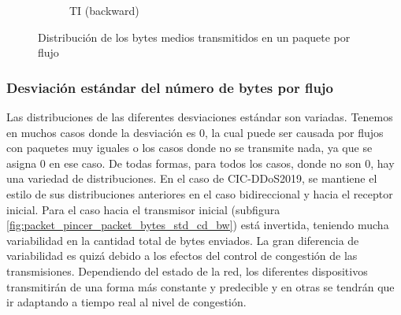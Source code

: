 \begin{figure}[H]
\begin{subfigure}[b]{0.26\textwidth}
        \caption{TI (backward)}
    \end{subfigure}
    \hfill
       \caption{Distribución de los bytes medios transmitidos en un paquete por flujo}
       \label{fig:packet_pincer_packet_bytes_mean}
\end{figure}

\subsubsection{Desviación estándar del número de bytes por flujo}

Las distribuciones de las diferentes desviaciones estándar son variadas. Tenemos en muchos casos donde la desviación es 0, la cual puede ser causada por flujos con paquetes muy iguales o los casos donde no se transmite nada, ya que se asigna 0 en ese caso. De todas formas, para todos los casos, donde no son 0, hay una variedad de distribuciones. En el caso de CIC-DDoS2019, se mantiene el estilo de sus distribuciones anteriores en el caso bidireccional y hacia el receptor inicial. Para el caso hacia el transmisor inicial (subfigura \ref{fig:packet_pincer_packet_bytes_std_cd_bw}) está invertida, teniendo mucha variabilidad en la cantidad total de bytes enviados. La gran diferencia de variabilidad es quizá debido a los efectos del control de congestión de las transmisiones. Dependiendo del estado de la red, los diferentes dispositivos transmitirán de una forma más constante y predecible y en otras se tendrán que ir adaptando a tiempo real al nivel de congestión.

